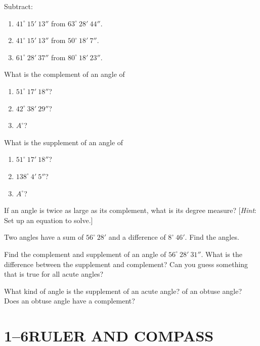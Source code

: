 \documentclass[11pt]{book}
\begin{document}
\begin{exercisecols}
\begin{exlist}
\begin{enumerate}[label=(\alph*), leftmargin=1.9em, itemsep=1pt, topsep=2pt]
  \end{enumerate}
\item Subtract:
  \begin{enumerate}[label=(\alph*), leftmargin=1.9em, itemsep=1pt, topsep=2pt]
  \item $41^\circ\ 15'\ 13''$ from $63^\circ\ 28'\ 44''$.
  \item $41^\circ\ 15'\ 13''$ from $50^\circ\ 18'\ 7''$.
  \item $61^\circ\ 28'\ 37''$ from $80^\circ\ 18'\ 23''$.
  \end{enumerate}
\item What is the complement of an angle of
  \begin{enumerate}[label=(\alph*), leftmargin=1.9em, itemsep=1pt, topsep=2pt]
  \item $51^\circ\ 17'\ 18''$?
  \item $42^\circ\ 38'\ 29''$?
  \item $A^\circ$?
  \end{enumerate}
\item What is the supplement of an angle of
  \begin{enumerate}[label=(\alph*), leftmargin=1.9em, itemsep=1pt, topsep=2pt]
  \item $51^\circ\ 17'\ 18''$?
  \item $138^\circ\ 4'\ 5''$?
  \item $A^\circ$?
  \end{enumerate}
\item If an angle is twice as large as its complement, what is its degree
      measure? [\emph{Hint}: Set up an equation to solve.]
\item Two angles have a sum of $56^\circ\ 28'$ and a difference of
      $8^\circ\ 46'$. Find the angles.
\item Find the complement and supplement of an angle of $56^\circ\ 28'\ 31''$.
      What is the difference between the supplement and complement? Can you guess
      something that is true for all acute angles?
\item What kind of angle is the supplement of an acute angle? of an obtuse angle?
      Does an obtuse angle have a complement?
\end{exlist}
\end{exercisecols}

\section*{1--6\quad RULER AND COMPASS}
\end{document}
